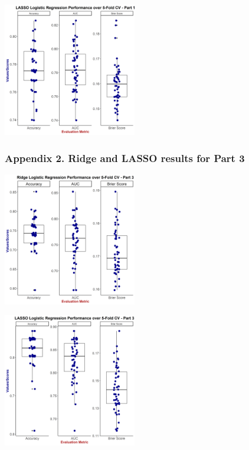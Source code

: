 \documentclass[a4paper,9pt,twocolumn,twoside,]{pinp}
\begin{document}
\begin{center}\includegraphics[width=220px]{images/part1lasso} \end{center}

\hypertarget{appendix-2.-ridge-and-lasso-results-for-part-3}{%
\subsubsection{Appendix 2. Ridge and LASSO results for Part
3}\label{appendix-2.-ridge-and-lasso-results-for-part-3}}

\begin{center}\includegraphics[width=220px]{images/part3ridge} \end{center}

\begin{center}\includegraphics[width=220px]{images/part3lasso} \end{center}
\end{document}

